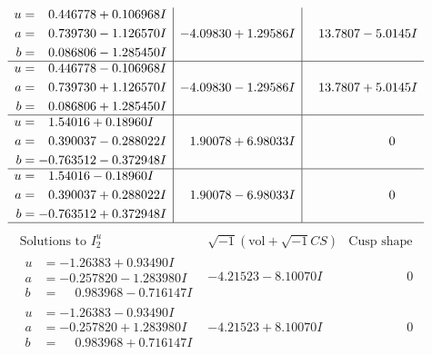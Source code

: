 \documentclass[1p]{elsarticle_modified}
\theoremstyle{definition}
\newcommand{\I}{\sqrt{-1}}
\begin{document}
$$\begin{array}{c|c|c}
\begin{aligned}
u &= \phantom{-}0.446778 + 0.106968 I \\
a &= \phantom{-}0.739730 - 1.126570 I \\
b &= \phantom{-}0.086806 - 1.285450 I\end{aligned}
 & -4.09830 + 1.29586 I & \phantom{-}13.7807 - 5.0145 I \\ \hline\begin{aligned}
u &= \phantom{-}0.446778 - 0.106968 I \\
a &= \phantom{-}0.739730 + 1.126570 I \\
b &= \phantom{-}0.086806 + 1.285450 I\end{aligned}
 & -4.09830 - 1.29586 I & \phantom{-}13.7807 + 5.0145 I \\ \hline\begin{aligned}
u &= \phantom{-}1.54016 + 0.18960 I \\
a &= \phantom{-}0.390037 - 0.288022 I \\
b &= -0.763512 - 0.372948 I\end{aligned}
 & \phantom{-}1.90078 + 6.98033 I & \phantom{-0.000000 } 0 \\ \hline\begin{aligned}
u &= \phantom{-}1.54016 - 0.18960 I \\
a &= \phantom{-}0.390037 + 0.288022 I \\
b &= -0.763512 + 0.372948 I\end{aligned}
 & \phantom{-}1.90078 - 6.98033 I & \phantom{-0.000000 } 0\\
 \hline 
 \end{array}$$\newpage$$\begin{array}{c|c|c}  
\text{Solutions to }I^u_{2}& \I (\text{vol} + \sqrt{-1}CS) & \text{Cusp shape}\\
 \hline 
\begin{aligned}
u &= -1.26383 + 0.93490 I \\
a &= -0.257820 - 1.283980 I \\
b &= \phantom{-}0.983968 - 0.716147 I\end{aligned}
 & -4.21523 - 8.10070 I & \phantom{-0.000000 } 0 \\ \hline\begin{aligned}
u &= -1.26383 - 0.93490 I \\
a &= -0.257820 + 1.283980 I \\
b &= \phantom{-}0.983968 + 0.716147 I\end{aligned}
 & -4.21523 + 8.10070 I & \phantom{-0.000000 } 0 \\ \hline\begin{aligned}

\end{aligned}
\end{array}$$
\end{document}
